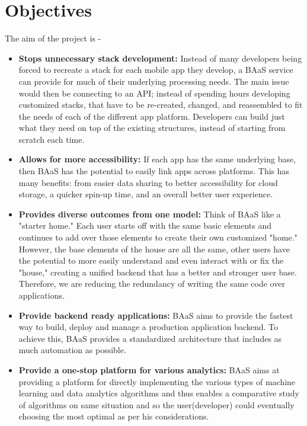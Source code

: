 \documentclass[a4paper,12pt]{report}
\begin{document}
    \section{Objectives}
    The aim of the project is - 
    \begin{itemize}
      \item {\textbf{Stops unnecessary stack development:} Instead of many developers being forced to recreate a stack for each mobile app they develop, a BAaS service can provide for much of their underlying processing needs. The main issue would then be connecting to an API; instead of spending hours developing customized stacks, that have to be re-created, changed, and reassembled to fit the needs of each of the different app platform. Developers can build just what they need on top of the existing structures, instead of starting from scratch each time. }
  
      \item {\textbf{Allows for more accessibility: } If each app has the same underlying base, then BAaS has the potential to easily link apps across platforms. This has many benefits: from easier data sharing to better accessibility for cloud storage, a quicker spin-up time, and an overall better user experience.      }
     
      \item {\textbf{Provides diverse outcomes from one model: } Think of BAaS like a "starter home." Each user starts off with the same basic elements and continues to add over those elements to create their own customized "home." However, the base elements of the house are all the same, other users have the potential to more easily understand and even interact with or fix the "house," creating a unified backend that has a better and stronger user base. Therefore, we are reducing the redundancy of writing the same code over applications.      }
     
      \item {\textbf{Provide backend ready applications: } BAaS aims to provide the fastest way to build, deploy and manage a production application backend. To achieve this, BAaS provides a standardized architecture that  includes as much automation as possible.      }
      
      \item {\textbf{Provide a one-stop platform for various analytics: } BAaS aims at providing a platform for directly implementing the various types of machine learning and data analytics algorithms and thus enables a comparative study of algorithms on same situation and so the user(developer) could eventually choosing the most optimal as per his considerations.      }
    \end{itemize}
    \hfill
\end{document}
